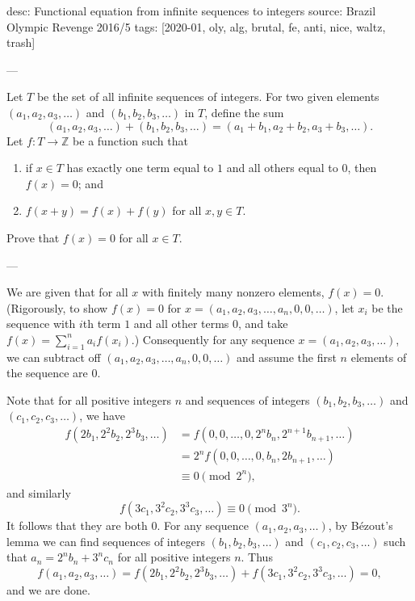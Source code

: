 desc: Functional equation from infinite sequences to integers
source: Brazil Olympic Revenge 2016/5
tags: [2020-01, oly, alg, brutal, fe, anti, nice, waltz, trash]

---

Let $T$ be the set of all infinite sequences of integers. For two given elements $(a_1,a_2,a_3,\ldots)$ and $(b_1,b_2,b_3,\ldots)$ in $T$, define the sum \[(a_1,a_2,a_3,\ldots)+(b_1,b_2,b_3,\ldots)=(a_1+b_1,a_2+b_2,a_3+b_3,\ldots).\]
Let $f:T\to\mathbb Z$ be a function such that
\begin{enumerate}[label=(\roman*),itemsep=0em]
    \item if $x\in T$ has exactly one term equal to $1$ and all others equal to $0$, then $f(x)=0$; and
    \item $f(x+y)=f(x)+f(y)$ for all $x,y\in T$.
\end{enumerate}
Prove that $f(x)=0$ for all $x\in T$.

---

We are given that for all $x$ with finitely many nonzero elements, $f(x)=0$. (Rigorously, to show $f(x)=0$ for $x=(a_1,a_2,a_3,\ldots,a_n,0,0,\ldots)$, let $x_i$ be the sequence with $i$th term $1$ and all other terms $0$, and take $f(x)=\sum_{i=1}^na_if(x_i)$.) Consequently for any sequence $x=(a_1,a_2,a_3,\ldots)$, we can subtract off $(a_1,a_2,a_3,\ldots,a_n,0,0,\ldots)$ and assume the first $n$ elements of the sequence are $0$.

Note that for all positive integers $n$ and sequences of integers $(b_1,b_2,b_3,\ldots)$ and $(c_1,c_2,c_3,\ldots)$, we have
\begin{align*}
    f(2b_1,2^2b_2,2^3b_3,\ldots)&=f(0,0,\ldots,0,2^nb_n,2^{n+1}b_{n+1},\ldots)\\
    &=2^nf(0,0,\ldots,0,b_n,2b_{n+1},\ldots)\\
    &\equiv0\pmod{2^n},
\end{align*}
and similarly \[f(3c_1,3^2c_2,3^3c_3,\ldots)\equiv0\pmod{3^n}.\]
It follows that they are both $0$. For any sequence $(a_1,a_2,a_3,\ldots)$, by B\'ezout's lemma we can find sequences of integers $(b_1,b_2,b_3,\ldots)$ and $(c_1,c_2,c_3,\ldots)$ such that $a_n=2^nb_n+3^nc_n$ for all positive integers $n$. Thus \[f(a_1,a_2,a_3,\ldots)=f(2b_1,2^2b_2,2^3b_3,\ldots)+f(3c_1,3^2c_2,3^3c_3,\ldots)=0,\]
and we are done.
